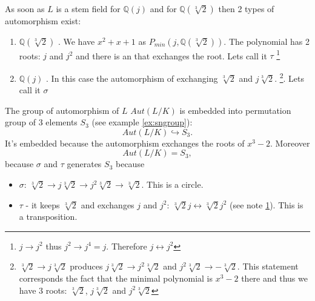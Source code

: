 \begin{example}
  
  As soon as $L$ is a stem field for $\mathbb{Q}\left(j\right)$ 
  and for $\mathbb{Q}\left(\sqrt[3]{2}\right)$ then 2 types of
  automorphism exist:
  \begin{enumerate}
    \item $\mathbb{Q}\left(\sqrt[3]{2}\right)$
      . We have
      $x^2+x+1$ as
      $P_{min}\left(j, \mathbb{Q}\left(\sqrt[3]{2}\right)\right)$. The
      polynomial has 2 roots: $j$ and $j^2$ and there is an
       that exchanges the root. Lets call it
      $\tau$
      \footnote{
        \label{note:lec2_example_j}
        $j \to j^2$ thus $j^2 \to j^4 = j$. Therefore $j
        \leftrightarrow j^2$
      }
      \item $\mathbb{Q}\left(j\right)$ . In
        this case the automorphism of exchanging $\sqrt[3]{2}$ and
        $j \sqrt[3]{2}$. \footnote{
          $\sqrt[3]{2} \to j \sqrt[3]{2}$ produces
          $j\sqrt[3]{2} \to j^2 \sqrt[3]{2}$ and
          $j^2 \sqrt[3]{2} \to - \sqrt[3]{2}$. This statement
          corresponds the fact that
          the minimal polynomial is $x^3 - 2$ there and thus we
          have 3 roots: $\sqrt[3]{2}$, $j \sqrt[3]{2}$ and $j^2
          \sqrt[3]{2}$ 
        }. Lets call it $\sigma$
  \end{enumerate}

  The group of automorphism of $L$ $Aut\left(L/K\right)$ is embedded
  into permutation group of 3 elements $S_3$ (see example \ref{ex:sngroup}):
  \[
  Aut\left(L/K\right) \hookrightarrow S_3.
  \]
  It's embedded because the automorphism exchanges the roots of
  $x^3-2$. Moreover
  \[
  Aut\left(L/K\right) = S_3,
  \]
  because $\sigma$ and $\tau$ generates $S_3$ because
  \begin{itemize}
  \item $\sigma$: $\sqrt[3]{2} \to j \sqrt[3]{2} \to j^2 \sqrt[3]{2}
    \to \sqrt[3]{2}$. This is a circle.
  \item $\tau$ - it keeps $\sqrt[3]{2}$ and exchanges $j$ and $j^2$:
    $\sqrt[3]{2} j \leftrightarrow \sqrt[3]{2} j^2$ (see note
    \ref{note:lec2_example_j}).  This is a
    transposition. 
  \end{itemize}


\end{example}
